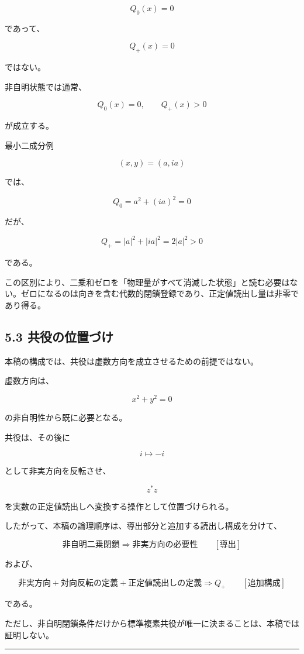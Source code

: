 \documentclass[
  a4paper,
  10pt]{article}
\begin{document}
\[
Q_0(x)=0
\]

であって、

\[
Q_+(x)=0
\]

ではない。

非自明状態では通常、

\[
Q_0(x)=0,
\qquad
Q_+(x)>0
\]

が成立する。

最小二成分例

\[
(x,y)=(a,ia)
\]

では、

\[
Q_0=a^2+(ia)^2=0
\]

だが、

\[
Q_+=|a|^2+|ia|^2=2|a|^2>0
\]

である。

この区別により、二乗和ゼロを「物理量がすべて消滅した状態」と読む必要はない。ゼロになるのは向きを含む代数的閉鎖登録であり、正定値読出し量は非零であり得る。

\subsection{5.3
共役の位置づけ}\label{53-ux5171ux5f79ux306eux4f4dux7f6eux3065ux3051}

本稿の構成では、共役は虚数方向を成立させるための前提ではない。

虚数方向は、

\[
x^2+y^2=0
\]

の非自明性から既に必要となる。

共役は、その後に

\[
i\longmapsto-i
\]

として非実方向を反転させ、

\[
z^*z
\]

を実数の正定値読出しへ変換する操作として位置づけられる。

したがって、本稿の論理順序は、導出部分と追加する読出し構成を分けて、

\[
\boxed{
\text{非自明二乗閉鎖}
\Rightarrow
\text{非実方向の必要性}
\qquad[\text{導出}]
}
\]

および、

\[
\boxed{
\text{非実方向}
+
\text{対向反転の定義}
+
\text{正定値読出しの定義}
\Rightarrow
Q_+
\qquad[\text{追加構成}]
}
\]

である。

ただし、非自明閉鎖条件だけから標準複素共役が唯一に決まることは、本稿では証明しない。

\begin{center}\rule{0.5\linewidth}{0.5pt}\end{center}
\end{document}
